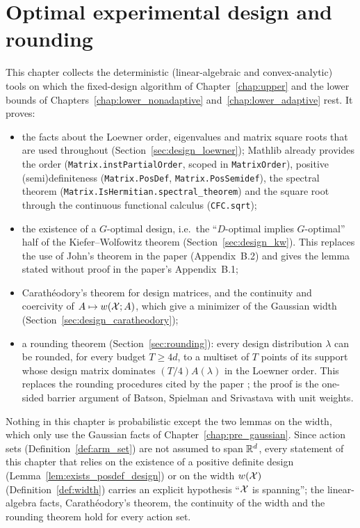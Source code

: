 \chapter{Optimal experimental design and rounding}
\label{chap:design}

This chapter collects the deterministic (linear-algebraic and convex-analytic) tools on which
the fixed-design algorithm of Chapter~\ref{chap:upper} and the lower bounds of
Chapters~\ref{chap:lower_nonadaptive} and~\ref{chap:lower_adaptive} rest. It proves:
\begin{itemize}
  \item the facts about the Loewner order, eigenvalues and matrix square roots that are used
        throughout (Section~\ref{sec:design_loewner}); Mathlib already provides the order
        (\texttt{Matrix.instPartialOrder}, scoped in \texttt{MatrixOrder}), positive
        (semi)definiteness (\texttt{Matrix.PosDef}, \texttt{Matrix.PosSemidef}), the spectral
        theorem (\texttt{Matrix.IsHermitian.spectral\_theorem}) and the square root through the
        continuous functional calculus (\texttt{CFC.sqrt});
  \item the existence of a $G$-optimal design, i.e.\ the ``$D$-optimal implies $G$-optimal''
        half of the Kiefer--Wolfowitz theorem (Section~\ref{sec:design_kw}). This replaces the
        use of John's theorem in the paper (Appendix~B.2) and gives the lemma stated without
        proof in the paper's Appendix~B.1;
  \item Carath\'eodory's theorem for design matrices, and the continuity and coercivity of
        $A \mapsto w(\mathcal{X};A)$, which give a minimizer of the Gaussian width
        (Section~\ref{sec:design_caratheodory});
  \item a rounding theorem (Section~\ref{sec:rounding}): every design distribution $\lambda$ can
        be rounded, for every budget $T \ge 4d$, to a multiset of $T$ points of its support whose
        design matrix dominates $(T/4)A(\lambda)$ in the Loewner order. This replaces the rounding
        procedures cited by the paper \cite{katz2020empirical,allen2021near}; the proof is the
        one-sided barrier argument of Batson, Spielman and Srivastava \cite{batson2012twice}
        with unit weights.
\end{itemize}
Nothing in this chapter is probabilistic except the two lemmas on the width, which only use
the Gaussian facts of Chapter~\ref{chap:pre_gaussian}. Since action sets
(Definition~\ref{def:arm_set}) are not assumed to span $\mathbb{R}^d$, every statement of this chapter
that relies on the existence of a positive definite design
(Lemma~\ref{lem:exists_posdef_design}) or on the width $w(\mathcal{X})$ (Definition~\ref{def:width})
carries an explicit hypothesis ``$\mathcal{X}$ is spanning''; the linear-algebra facts,
Carath\'eodory's theorem, the continuity of the width and the rounding theorem hold for every
action set.


